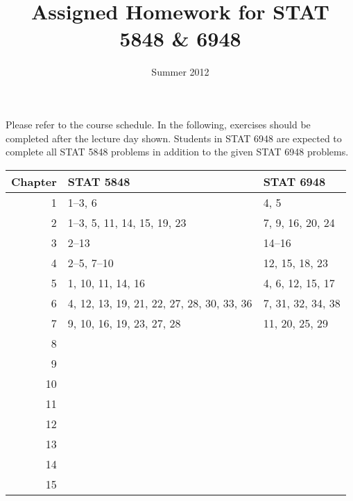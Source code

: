 \documentclass[11pt]{article}
\title{\vspace{-0.5in}Assigned Homework for STAT 5848 \& 6948}
\date{\vspace{-0.5in}Summer 2012}
\begin{document}
\maketitle


Please refer to the course schedule.  In the following, exercises should be completed after the lecture day shown.  Students in STAT 6948 are expected to complete all STAT 5848 problems in addition to the given STAT 6948 problems.

\vspace{0.25in}


\begin{center}
\begin{tabular}{rll}
 \textbf{Chapter}  &  \textbf{STAT 5848}                         &  \textbf{STAT 6948}  \\
\hline
                1  &  1--3, 6                                    &  4, 5                \\
                2  &  1--3, 5, 11, 14, 15, 19, 23                &  7, 9, 16, 20, 24    \\
                3  &  2--13                                      &  14--16              \\
                4  &  2--5, 7--10                                &  12, 15, 18, 23      \\
                5  &  1, 10, 11, 14, 16                          &  4, 6, 12, 15, 17    \\
                6  &  4, 12, 13, 19, 21, 22, 27, 28, 30, 33, 36  &  7, 31, 32, 34, 38   \\
                7  &  9, 10, 16, 19, 23, 27, 28                  &  11, 20, 25, 29      \\
                8  &                                             &                      \\
                9  &                                             &                      \\
               10  &                                             &                      \\
               11  &                                             &                      \\
               12  &                                             &                      \\
               13  &                                             &                      \\
               14  &                                             &                      \\
               15  &                                             &                      \\
\hline
\end{tabular}
\end{center}
\end{document}

